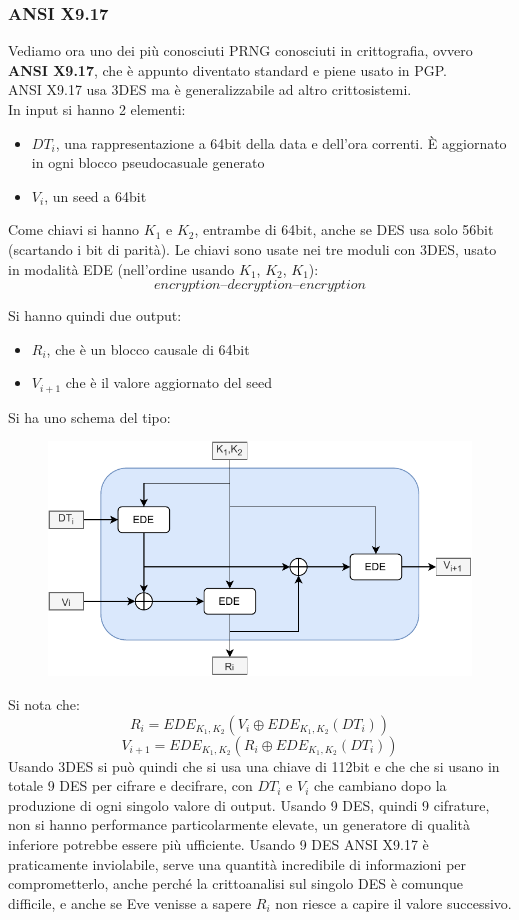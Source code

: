 \documentclass[a4paper,12pt, oneside]{book}
\begin{document}
\subsubsection{ANSI X9.17}
Vediamo ora uno dei più conosciuti PRNG conosciuti in crittografia, ovvero
\textbf{ANSI X9.17}, che è appunto diventato standard e piene usato in PGP.\\
ANSI X9.17 usa 3DES ma è generalizzabile ad altro crittosistemi.\\
In input si hanno 2 elementi:
\begin{itemize}
  \item $DT_i$, una rappresentazione a 64bit della data e dell'ora correnti. È
  aggiornato in ogni blocco pseudocasuale generato 
  \item $V_i$, un seed a 64bit
\end{itemize}
Come chiavi si hanno $K_1$ e $K_2$, entrambe di 64bit, anche se DES usa solo
56bit (scartando i bit di parità). Le chiavi sono usate nei 
tre moduli con 3DES, usato in modalità EDE (nell'ordine usando $K_1$, $K_2$,
$K_1$): 
\[encryption – decryption – encryption\]

Si hanno quindi due output:
\begin{itemize}
  \item $R_i$, che è un blocco causale di 64bit
  \item $V_{i+1}$ che è il valore aggiornato del seed
\end{itemize}
Si ha uno schema del tipo:
\begin{figure}[H]
  \centering
  \includegraphics[scale = 0.9]{img/ansi.pdf}
\end{figure}
Si nota che:
\[R_i=EDE_{K_1,K_2}(V_i\oplus EDE_{K_1,K_2}(DT_i))\]
\[V_{i+1}=EDE_{K_1,K_2}(R_i\oplus EDE_{K_1,K_2}(DT_i))\]
Usando 3DES si può quindi che si usa una chiave di 112bit e che che si usano in
totale 9 DES per cifrare e decifrare, con $DT_i$ e $V_i$ che cambiano dopo la
produzione di ogni singolo valore di output. Usando 9 DES, quindi 9 cifrature,
non si hanno performance particolarmente elevate, un generatore di qualità
inferiore potrebbe essere più ufficiente. Usando 9 DES ANSI X9.17 è praticamente
inviolabile, serve una quantità incredibile di informazioni per comprometterlo,
anche perché la crittoanalisi sul singolo DES è comunque difficile, e
anche se Eve venisse a sapere $R_i$ non riesce a capire il valore successivo. 
\end{document}
